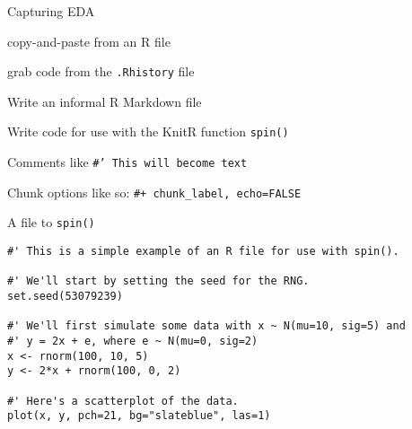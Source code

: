 \documentclass[aspectratio=169,12pt,t]{beamer}
\begin{document}
\begin{frame}{Capturing EDA}

\vspace{24pt}

\bi
\item copy-and-paste from an R file
\item grab code from the {\tt .Rhistory} file
\item Write an informal R Markdown file
\item Write code for use with the KnitR function {\tt spin()}
\bi
\item[] Comments like \; {\hilit \tt \#' This will become text}
\item[] Chunk options like so: \; {\hilit \tt \#+ chunk\_label, echo=FALSE}
\ei
\ei

\end{frame}


\begin{frame}[fragile]{A file to {\tt spin()}}

\vspace{24pt}

\begin{lstlisting}
#' This is a simple example of an R file for use with spin().

#' We'll start by setting the seed for the RNG.
set.seed(53079239)

#' We'll first simulate some data with x ~ N(mu=10, sig=5) and
#' y = 2x + e, where e ~ N(mu=0, sig=2)
x <- rnorm(100, 10, 5)
y <- 2*x + rnorm(100, 0, 2)

#' Here's a scatterplot of the data.
plot(x, y, pch=21, bg="slateblue", las=1)
\end{lstlisting}

\end{frame}
\end{document}
